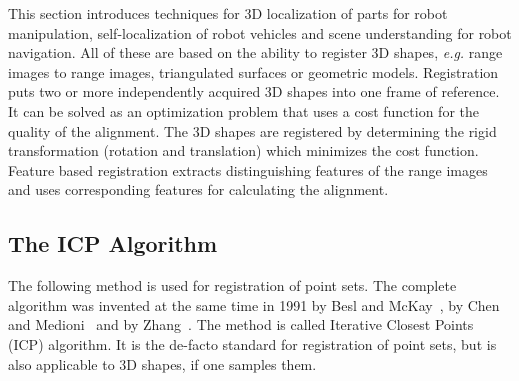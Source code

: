 \documentclass[twocolumn,oneside]{book}
\begin{document}
This section introduces techniques for 3D localization of parts for
robot manipulation, self-localization of robot vehicles and scene
understanding for robot navigation.  All of these are based on the
ability to register 3D shapes, {\it e.g.}  range images to range
images, triangulated surfaces or geometric models.  Registration puts
two or more independently acquired 3D shapes into one frame of
reference. It can be solved as an optimization problem that uses a
cost function for the quality of the alignment. The 3D shapes are
registered by determining the rigid transformation (rotation and
translation) which minimizes the cost function. Feature based
registration extracts distinguishing features of the range images and
uses corresponding features for calculating the alignment.

\subsection{The ICP Algorithm}

The following method is used for registration of point sets. The
complete algorithm was invented at the same time in 1991 by Besl and
McKay~\cite{Besl_1992}, by Chen and Medioni~\cite{Chen_1991} and by
Zhang~\cite{Zhang_1992}. The method is called Iterative Closest Points
(ICP) algorithm. It is the de-facto standard for registration of point
sets, but is also applicable to 3D shapes, if one samples them.
\end{document}
